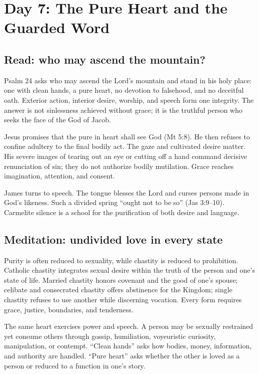 \section{Day 7: The Pure Heart and the Guarded Word}


\subsection{Read: who may ascend the mountain?}

Psalm 24 asks who may ascend the Lord's mountain and stand in his holy place: one with clean hands, a pure heart, no devotion to falsehood, and no deceitful oath. Exterior action, interior desire, worship, and speech form one integrity. The answer is not sinlessness achieved without grace; it is the truthful person who seeks the face of the God of Jacob.

Jesus promises that the pure in heart shall see God (Mt 5:8). He then refuses to confine adultery to the final bodily act. The gaze and cultivated desire matter. His severe images of tearing out an eye or cutting off a hand command decisive renunciation of sin; they do not authorize bodily mutilation. Grace reaches imagination, attention, and consent.

James turns to speech. The tongue blesses the Lord and curses persons made in God's likeness. Such a divided spring ``ought not to be so'' (Jas 3:9--10). Carmelite silence is a school for the purification of both desire and language.

\subsection{Meditation: undivided love in every state}

Purity is often reduced to sexuality, while chastity is reduced to prohibition. Catholic chastity integrates sexual desire within the truth of the person and one's state of life. Married chastity honors covenant and the good of one's spouse; celibate and consecrated chastity offers abstinence for the Kingdom; single chastity refuses to use another while discerning vocation. Every form requires grace, justice, boundaries, and tenderness.

The same heart exercises power and speech. A person may be sexually restrained yet consume others through gossip, humiliation, voyeuristic curiosity, manipulation, or contempt. ``Clean hands'' asks how bodies, money, information, and authority are handled. ``Pure heart'' asks whether the other is loved as a person or reduced to a function in one's story.

